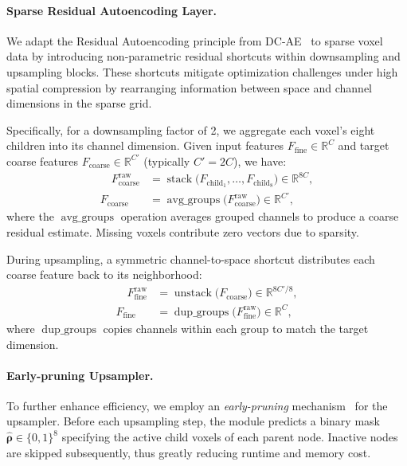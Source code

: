 \documentclass[10pt,twocolumn,letterpaper]{article}
\newcommand{\paravspace}{\vspace{-11pt}}
\begin{document}
\paravspace
\paragraph{Sparse Residual Autoencoding Layer.}
We adapt the Residual Autoencoding principle from DC-AE~\cite{chen2024deep} to sparse voxel data by introducing non-parametric residual shortcuts within downsampling and upsampling blocks.
These shortcuts mitigate optimization challenges under high spatial compression by rearranging information between space and channel dimensions in the sparse grid.

Specifically, for a downsampling factor of 2, we aggregate each voxel’s eight children into its channel dimension.
Given input features $F_{\text{fine}}\in\mathbb{R}^{C}$ and target coarse features $F_{\text{coarse}}\in\mathbb{R}^{C'}$ (typically $C'=2C$), we have:
\begin{equation}
	\begin{split}
		\quad F_{\text{coarse}}^{\text{raw}} &= \operatorname{stack}\big(F_{\text{child}_1},\dots,F_{\text{child}_8}\big)\in\mathbb{R}^{8C},\\
		F_{\text{coarse}} &= \operatorname{avg\_groups}\big(F_{\text{coarse}}^{\text{raw}}\big)\in\mathbb{R}^{C'},
	\end{split}
\end{equation}
where the $\operatorname{avg\_groups}$ operation averages grouped channels to produce a coarse residual estimate. Missing voxels contribute zero vectors due to sparsity.

During upsampling, a symmetric channel-to-space shortcut distributes each coarse feature back to its neighborhood:
\begin{equation}
	\begin{split}
		\quad F_{\text{fine}}^{\text{raw}} &= \operatorname{unstack}\big(F_{\text{coarse}}\big)\in\mathbb{R}^{8C'/8},\\
		F_{\text{fine}} &= \operatorname{dup\_groups}\big(F_{\text{fine}}^{\text{raw}}\big)\in\mathbb{R}^{C},
	\end{split}
\end{equation}
where $\operatorname{dup\_groups}$ copies channels within each group to match the target dimension.

\paravspace
\paragraph{Early-pruning Upsampler.}
To further enhance efficiency, we employ an \emph{early-pruning} mechanism~\cite{ren2024xcube} for the upsampler.
Before each upsampling step, the module predicts a binary mask $\boldsymbol{\hat{\rho}}\in\{0,1\}^8$ specifying the active child voxels of each parent node.
Inactive nodes are skipped subsequently, thus greatly reducing runtime and memory cost.
\end{document}
